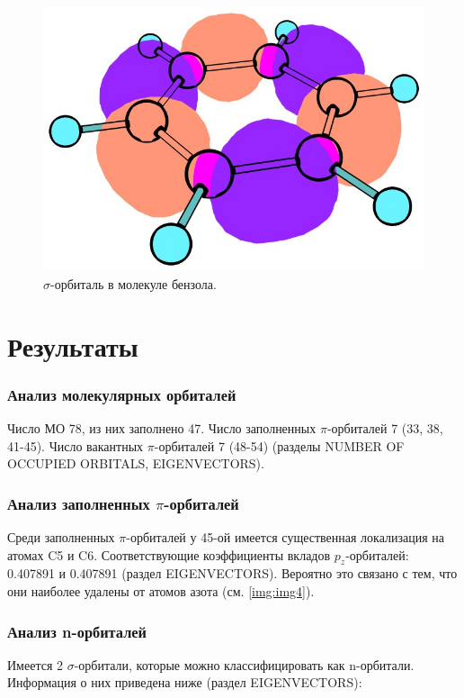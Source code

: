 \begin{figure}[H]
\centering
\captionsetup{justification=centering}
\includegraphics[scale=0.4]{fig/3.jpg}
\caption{$\sigma$-орбиталь в молекуле бензола.}
\end{figure}

\newpage
\section{Результаты}
\subsubsection*{Анализ молекулярных орбиталей}
Число МО 78, из них заполнено 47. Число заполненных $\pi$-орбиталей 7 (33, 38, 41-45). Число вакантных $\pi$-орбиталей 7 (48-54) (разделы NUMBER OF OCCUPIED ORBITALS, EIGENVECTORS).
\subsubsection*{Анализ заполненных $\pi$-орбиталей}
Среди заполненных $\pi$-орбиталей у 45-ой имеется существенная локализация на атомах C5 и C6. Соответствующие коэффициенты вкладов $p_z$-орбиталей: 0.407891 и 0.407891 (раздел EIGENVECTORS). Вероятно это связано с тем, что они наиболее удалены от атомов азота (см. \ref{img:img4}).
\subsubsection*{Анализ n-орбиталей}
Имеется 2 $\sigma$-орбитали, которые можно классифицировать как n-орбитали. Информация о них приведена ниже (раздел EIGENVECTORS):

